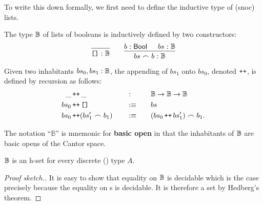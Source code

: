 To write this down formally, we first need to define the inductive type of (snoc) lists.

\begin{defn}\label{defn:list}
  The type $\mathbb{B}{}$ of lists of booleans is inductively defined by two constructors:
  \[
    \begin{prooftree}
      \infer0{\oftyI{\emptylist{}}{\bitlist{}}}
    \end{prooftree}
    \qquad
    \begin{prooftree}
      \hypo{\oftyI{b}{\bool{}}}
      \hypo{\oftyI{bs}{\bitlist{}}}
      \infer2{\oftyI{bs \frown b}{\bitlist{}}}
    \end{prooftree}
  \]
\end{defn}

\begin{defn}\label{defn:concat}
  Given two inhabitants $bs_0, bs_1:\mathbb{B}{}$, the appending of $bs_1$ onto
  $bs_0$, denoted $\operatorname{\textnormal{\texttt{++}}}$, is defined by recursion as follows:
  \begin{alignat*}{3}
    \_&\operatorname{\textnormal{\texttt{++}}}\_               \quad&&:\quad   && \mathbb{B}{} \rightarrow \mathbb{B}{} \rightarrow \mathbb{B}{}      \\
    bs_0 &\operatorname{\textnormal{\texttt{++}}} \text{\texttt{[]}}   \quad&&:\equiv\quad && bs                                        \\
    bs_0 &\operatorname{\textnormal{\texttt{++}}} (bs_1' \frown b_1) \quad&&:\equiv\quad && (bs_0 \operatorname{\textnormal{\texttt{++}}} bs_1') \frown b_1                .
  \end{alignat*}
\end{defn}

The notation ``$\mathbb{B}$'' is mnemonic for \textbf{basic open} in that the inhabitants
of $\mathbb{B}{}$ are basic opens of the Cantor space.

\begin{prop}\label{prop:list-set}
  $\mathbb{B}{}$ is an h-set for every discrete () type $A$.
\end{prop}
\begin{proof}[Proof sketch.]
  It is easy to show that equality on $\mathbb{B}{}$ is decidable which is the case
  precisely because the equality on \verbool{}s is decidable. It is therefore a set by
  Hedberg's theorem.
\end{proof}


